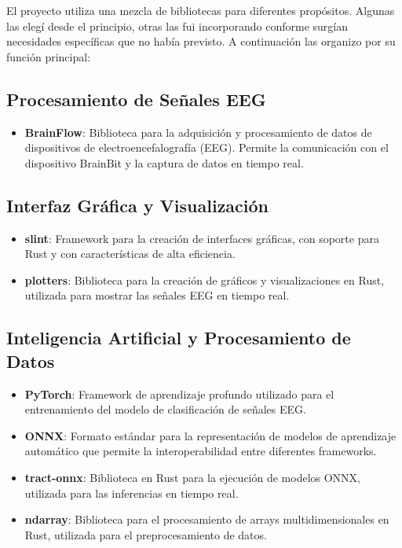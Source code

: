 El proyecto utiliza una mezcla de bibliotecas para diferentes propósitos. Algunas las elegí desde el principio, otras las fui incorporando conforme surgían necesidades específicas que no había previsto. A continuación las organizo por su función principal:

\subsection{Procesamiento de Señales EEG}
\begin{itemize}
    \item \textbf{BrainFlow}: Biblioteca para la adquisición y procesamiento de datos de dispositivos de electroencefalografía (EEG). Permite la comunicación con el dispositivo BrainBit y la captura de datos en tiempo real.
\end{itemize}

\subsection{Interfaz Gráfica y Visualización}
\begin{itemize}
    \item \textbf{slint}: Framework para la creación de interfaces gráficas, con soporte para Rust y con características de alta eficiencia.
    \item \textbf{plotters}: Biblioteca para la creación de gráficos y visualizaciones en Rust, utilizada para mostrar las señales EEG en tiempo real.
\end{itemize}

\subsection{Inteligencia Artificial y Procesamiento de Datos}
\begin{itemize}
    \item \textbf{PyTorch}: Framework de aprendizaje profundo utilizado para el entrenamiento del modelo de clasificación de señales EEG.
    \item \textbf{ONNX}: Formato estándar para la representación de modelos de aprendizaje automático que permite la interoperabilidad entre diferentes frameworks.
    \item \textbf{tract-onnx}: Biblioteca en Rust para la ejecución de modelos ONNX, utilizada para las inferencias en tiempo real.
    \item \textbf{ndarray}: Biblioteca para el procesamiento de arrays multidimensionales en Rust, utilizada para el preprocesamiento de datos.
\end{itemize}


